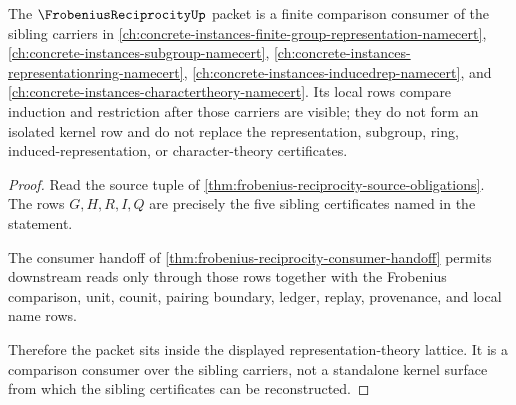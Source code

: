 \begin{theorem}\label{thm:frobenius-reciprocity-sibling-lattice}
The $\FrobeniusReciprocityUp$ packet is a finite comparison consumer of the sibling carriers in \autoref{ch:concrete-instances-finite-group-representation-namecert}, \autoref{ch:concrete-instances-subgroup-namecert}, \autoref{ch:concrete-instances-representationring-namecert}, \autoref{ch:concrete-instances-inducedrep-namecert}, and \autoref{ch:concrete-instances-charactertheory-namecert}. Its local rows compare induction and restriction after those carriers are visible; they do not form an isolated kernel row and do not replace the representation, subgroup, ring, induced-representation, or character-theory certificates.
\end{theorem}
\begin{proof}
Read the source tuple of \autoref{thm:frobenius-reciprocity-source-obligations}. The rows $G,H,R,I,Q$ are precisely the five sibling certificates named in the statement.

The consumer handoff of \autoref{thm:frobenius-reciprocity-consumer-handoff} permits downstream reads only through those rows together with the Frobenius comparison, unit, counit, pairing boundary, ledger, replay, provenance, and local name rows.

Therefore the packet sits inside the displayed representation-theory lattice. It is a comparison consumer over the sibling carriers, not a standalone kernel surface from which the sibling certificates can be reconstructed.
\end{proof}


\begin{closurestatus}{\FrobeniusReciprocityUp}
  \theoryclosure{\seedClosure}
  \formalstatus{\unformalizedV}
\end{closurestatus}
